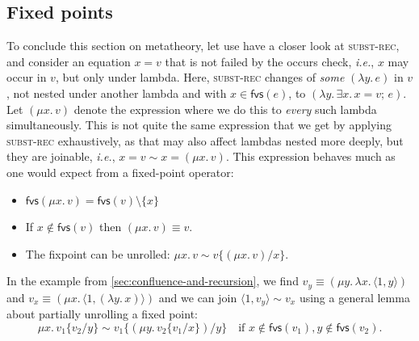 \documentclass[acmsmall,review,dvipsnames]{acmart}
\newcommand{\Varid}[1]{\mathit{#1}}
\newcommand{\ie}{\emph{i.e.}}	%
\newcommand{\rulename}[1]{\textsc{\small #1}}
\newcommand{\freevars}[1]{\mathsf{fvs}(#1)}
\newcommand{\subst}[3]{#1\{#3/#2\}}
\begin{document}
\subsection{Fixed points}

To conclude this section on metatheory, let use have a closer look at \rulename{subst-rec}, and consider an equation \ensuremath{\Varid{x}\mathrel{=}\Varid{v}} that is not failed by the occurs check, {\ie}, \ensuremath{\Varid{x}} may occur in \ensuremath{\Varid{v}}, but only under lambda. Here, \rulename{subst-rec} changes of \emph{some} \ensuremath{(\lambda\Varid{y}.\,\Varid{e})} in \ensuremath{\Varid{v}}, not nested under another lambda and with $x\in\freevars{e}$, to \ensuremath{(\lambda\Varid{y}.\,\exists\Varid{x}.\,\Varid{x}\mathrel{=}\Varid{v};\,\Varid{e})}. Let \ensuremath{(\mu\Varid{x}.\,\Varid{v})} denote the expression where we do this to \emph{every} such lambda simultaneously. This is not quite the same expression that we get by applying \rulename{subst-rec} exhaustively, as that may also affect lambdas nested more deeply, but they are joinable, {\ie}, \ensuremath{\Varid{x}\mathrel{=}\Varid{v}\mathrel{\sim}\Varid{x}\mathrel{=}(\mu\Varid{x}.\,\Varid{v})}.
%
This expression behaves much as one would expect from a fixed-point operator:
\begin{itemize}
\item $\freevars{\ensuremath{\mu\Varid{x}.\,\Varid{v}}} = \freevars v \setminus \{x\}$
\item If $x \notin \freevars{v}$ then $\ensuremath{(\mu\Varid{x}.\,\Varid{v})\mathrel{\equiv}\Varid{v}}$.
\item The fixpoint can be unrolled: \ensuremath{\mu\Varid{x}.\,\Varid{v}\mathrel{\sim}\subst{\Varid{v}}{\Varid{x}}{(\mu\Varid{x}.\,\Varid{v})}}.
\end{itemize}

In the example from \cref{sec:confluence-and-recursion}, we find \ensuremath{\Varid{v}_{\Varid{y}}\mathrel{\equiv}(\mu\Varid{y}.\,\lambda\Varid{x}.\,\langle{}\mathrm{1},\Varid{y}\rangle)} and \ensuremath{\Varid{v}_{\Varid{x}}\mathrel{\equiv}(\mu\Varid{x}.\,\langle{}\mathrm{1},(\lambda\Varid{y}.\,\Varid{x})\rangle)} and we can join \ensuremath{\langle{}\mathrm{1},\Varid{v}_{\Varid{y}}\rangle\mathrel{\sim}\Varid{v}_{\Varid{x}}} using a general lemma about partially unrolling a fixed point:
\[
\ensuremath{\mu\Varid{x}.\,\subst{\Varid{v}_{\mathrm{1}}}{\Varid{y}}{\Varid{v}_{\mathrm{2}}}\mathrel{\sim}\subst{\Varid{v}_{\mathrm{1}}}{\Varid{y}}{(\mu\Varid{y}.\,\subst{\Varid{v}_{\mathrm{2}}}{\Varid{x}}{\Varid{v}_{\mathrm{1}}})}} \quad \text{if } x \notin \freevars{v_1}, y \notin\freevars{v_2}.
\]
\end{document}

